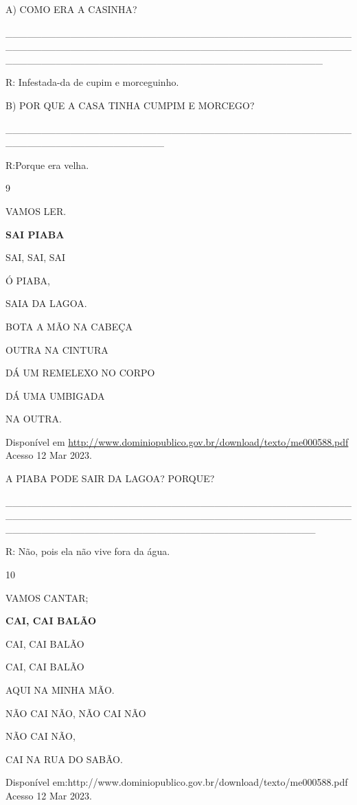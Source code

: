 {{A) COMO ERA A CASINHA?

\_\_\_\_\_\_\_\_\_\_\_\_\_\_\_\_\_\_\_\_\_\_\_\_\_\_\_\_\_\_\_\_\_\_\_\_\_\_\_\_\_\_\_\_\_\_\_\_\_\_\_\_\_\_\_\_\_\_\_\_\_\_\_\_\_\_\_\_\_\_\_\_\_\_\_\_\_\_\_\_\_\_\_\_\_\_\_\_\_\_\_\_\_\_\_\_\_\_\_\_\_\_\_\_\_\_\_\_\_\_\_\_\_\_\_\_\_\_\_\_\_\_\_\_\_\_\_\_\_\_\_\_\_\_\_\_\_\_\_\_

R: Infestada-da de cupim e morceguinho.

B) POR QUE A CASA TINHA CUMPIM E MORCEGO?

\_\_\_\_\_\_\_\_\_\_\_\_\_\_\_\_\_\_\_\_\_\_\_\_\_\_\_\_\_\_\_\_\_\_\_\_\_\_\_\_\_\_\_\_\_\_\_\_\_\_\_\_\_\_\_\_\_\_\_\_\_\_\_\_\_\_\_\_\_\_

R:Porque era velha.

\num{9}

VAMOS LER.

\textbf{SAI PIABA}

SAI, SAI, SAI

Ó PIABA,

SAIA DA LAGOA.

BOTA A MÃO NA CABEÇA

OUTRA NA CINTURA

DÁ UM REMELEXO NO CORPO

DÁ UMA UMBIGADA

NA OUTRA.

Disponível em
\url{http://www.dominiopublico.gov.br/download/texto/me000588.pdf}
Acesso 12 Mar 2023.

A PIABA PODE SAIR DA LAGOA? PORQUE?

\_\_\_\_\_\_\_\_\_\_\_\_\_\_\_\_\_\_\_\_\_\_\_\_\_\_\_\_\_\_\_\_\_\_\_\_\_\_\_\_\_\_\_\_\_\_\_\_\_\_\_\_\_\_\_\_\_\_\_\_\_\_\_\_\_\_\_\_\_\_\_\_\_\_\_\_\_\_\_\_\_\_\_\_\_\_\_\_\_\_\_\_\_\_\_\_\_\_\_\_\_\_\_\_\_\_\_\_\_\_\_\_\_\_\_\_\_\_\_\_\_\_\_\_\_\_\_\_\_\_\_\_\_\_\_\_\_\_\_

R: Não, pois ela não vive fora da água.

\num{10}

VAMOS CANTAR;

\textbf{CAI, CAI BALÃO}

CAI, CAI BALÃO

CAI, CAI BALÃO

AQUI NA MINHA MÃO.

NÃO CAI NÃO, NÃO CAI NÃO

NÃO CAI NÃO,

CAI NA RUA DO SABÃO.

Disponível
em:http://www.dominiopublico.gov.br/download/texto/me000588.pdf Acesso
12 Mar 2023.

}}
